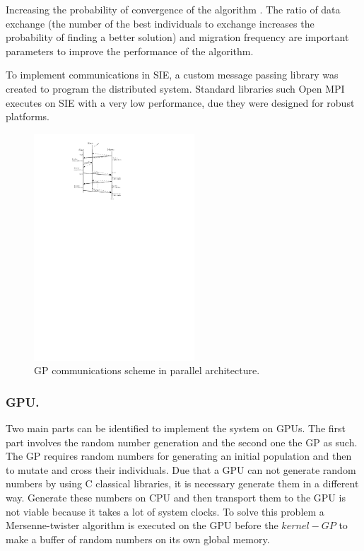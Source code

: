 \documentclass{sig-alternate}
\begin{document}
Increasing the probability of convergence of the algorithm \cite{cantu:2001}. The ratio of data exchange (the number of the best individuals to exchange increases the probability of finding a better solution) and migration frequency are important parameters to improve the performance of the algorithm. 

To implement communications in SIE, a custom message passing library was created to program the distributed system. Standard libraries such Open MPI  executes on SIE with a very low performance, due they were designed for robust platforms.

\begin{figure}[htpb]
\begin{center} 
\includegraphics[width=6cm]{./images/communications} \end{center}
\caption{GP communications scheme in parallel architecture.}\label{fig:communications}
\end{figure}


\subsubsection{GPU.}
Two main parts can be identified to implement the system on GPUs. The first part involves the random number generation and the second one the GP as such. The GP requires random numbers for generating an initial population and then to mutate and cross their individuals. Due that a GPU can not generate random numbers by using C classical libraries, it is necessary generate them in a different way. Generate these numbers on CPU and then transport them to the GPU is not viable because it takes a lot of system clocks. To solve this problem a Mersenne-twister algorithm is executed on the GPU before the $kernel-GP$ to make a buffer of random numbers on its own global memory.
\end{document}
